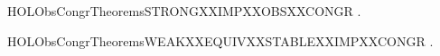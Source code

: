 \newcommand{\HOLObsCongrTheoremsPROPSix}{\UseVerbatim{HOLObsCongrTheoremsPROPSix}}
\begin{SaveVerbatim}{HOLObsCongrTheoremsSTRONGXXIMPXXOBSXXCONGR}
\HOLTokenTurnstile{} \HOLSymConst{\HOLTokenForall{}} .    \HOLSymConst{\HOLTokenImp{}}   
\end{SaveVerbatim}
\newcommand{\HOLObsCongrTheoremsSTRONGXXIMPXXOBSXXCONGR}{\UseVerbatim{HOLObsCongrTheoremsSTRONGXXIMPXXOBSXXCONGR}}
\begin{SaveVerbatim}{HOLObsCongrTheoremsWEAKXXEQUIVXXSTABLEXXIMPXXCONGR}
\HOLTokenTurnstile{} \HOLSymConst{\HOLTokenForall{}} .
          \HOLSymConst{\HOLTokenConj{}}   \HOLSymConst{\HOLTokenConj{}}   \HOLSymConst{\HOLTokenImp{}}   
\end{SaveVerbatim}
\newcommand{\HOLObsCongrTheoremsWEAKXXEQUIVXXSTABLEXXIMPXXCONGR}{\UseVerbatim{HOLObsCongrTheoremsWEAKXXEQUIVXXSTABLEXXIMPXXCONGR}}
